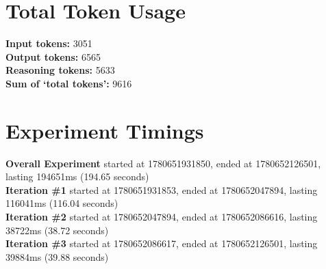 \documentclass{article}
\begin{document}
\section*{Total Token Usage}
\textbf{Input tokens: }3051
\\\textbf{Output tokens: }6565
\\\textbf{Reasoning tokens: }5633
\\\textbf{Sum of `total tokens': }9616
\section*{Experiment Timings}
\textbf{Overall Experiment} started at 1780651931850, ended at 1780652126501, lasting 194651ms (194.65 seconds)
\\\textbf{Iteration \#1} started at 1780651931853, ended at 1780652047894, lasting 116041ms (116.04 seconds)
\\\textbf{Iteration \#2} started at 1780652047894, ended at 1780652086616, lasting 38722ms (38.72 seconds)
\\\textbf{Iteration \#3} started at 1780652086617, ended at 1780652126501, lasting 39884ms (39.88 seconds)
\end{document}
